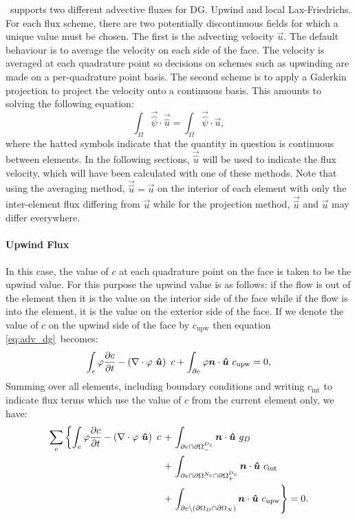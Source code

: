 \fluidity\ supports two different advective fluxes for DG. Upwind and local
Lax-Friedrichs. For each flux scheme, there are two potentially
discontinuous fields for which a unique value must be chosen. The first is
the advecting velocity $\vec{u}$. The default behaviour is to average the
velocity on each side of the face. The velocity is averaged at each
quadrature point so decisions on schemes such as upwinding are made on a
per-quadrature point basis. The second scheme is to apply a Galerkin
projection to project the velocity onto a continuous basis. This amounts to
solving the following equation:
\begin{equation}
  \int_\Omega \vec{\hat{\psi}} \cdot\vec{\hat{u}}
  = \int_\Omega \vec{\hat{\psi}}\cdot \vec{u},
\end{equation}
where the hatted symbols indicate that the quantity in question is
continuous between elements. In the following sections, $\vec{\hat{u}}$ will
be used to indicate the flux velocity, which will have been calculated with
one of these methods. Note that using the averaging method,
$\vec{\hat{u}}=\vec{u}$ on the interior of each element with only the inter-element
flux differing from $\vec{u}$ while for the projection method, $\vec{\hat
  u}$ and $\vec{u}$ may differ everywhere.

\paragraph{Upwind Flux}

In this case, the value of $c$ at each quadrature point on the face is taken
to be the upwind value. For this purpose the upwind value is as follows: if
the flow is out of the element then it is the value on the interior side of
the face while if the flow is into the element, it is the value on the
exterior side of the face. If we denote the value of $c$ on the upwind side
of the face by $c_{\mathrm{upw}}$ then equation \eqref{eq:adv_dg}\ becomes:
\begin{equation}
  \int_e \varphi \frac{\partial c}{\partial t} -
    \left(\nabla\cdot \varphi~{\mbox{\boldmath$\hat u$}}\right)~c +
    \int_{\partial e} \varphi{\mbox{\boldmath$n$}}\cdot{\mbox{\boldmath$\hat u$}}~c_{\mathrm{upw}}
    = 0,
\end{equation}
Summing over all elements, including boundary conditions and writing
$c_{\mathrm{int}}$ to indicate flux terms which use the value of $c$ from the
current element only, we have:
\begin{equation}
  \begin{split}
    \sum_e \left\{ \int_e \varphi \frac{\partial c}{\partial t}
    - \left(\nabla\cdot \varphi~{\mbox{\boldmath$\hat u$}}\right)~c \right.
    &+ \left. \int_{\partial e \cap\partial\Omega^{D_c}_-} {\mbox{\boldmath$n$}}\cdot{\mbox{\boldmath$\hat u$}}~g_D \right. \\
    &+ \left. \int_{\partial e \cap\partial\Omega^{N_c}\cap\partial\Omega^{D_c}_+} {\mbox{\boldmath$n$}}\cdot{\mbox{\boldmath$\hat u$}}~c_{\mathrm{int}} \right. \\
    &+ \left. \int_{\partial e\setminus (\partial\Omega_D\cap\partial\Omega_N)}
    {\mbox{\boldmath$n$}}\cdot{\mbox{\boldmath$\hat u$}}~c_{\mathrm{upw}} \right\} =0.
    \label{eq:dg_adv_diff_integrated_once}
  \end{split}
\end{equation}

